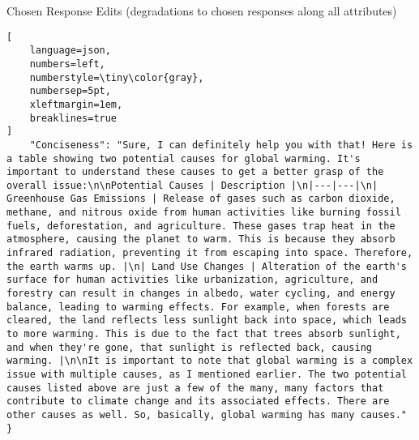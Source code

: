 \begin{promptbox}{Chosen Response Edits (degradations to chosen responses along all attributes)}
\begin{lstlisting}[
    language=json,
    numbers=left,
    numberstyle=\tiny\color{gray},
    numbersep=5pt,
    xleftmargin=1em,
    breaklines=true
]
    "Conciseness": "Sure, I can definitely help you with that! Here is a table showing two potential causes for global warming. It's important to understand these causes to get a better grasp of the overall issue:\n\nPotential Causes | Description |\n|---|---|\n| Greenhouse Gas Emissions | Release of gases such as carbon dioxide, methane, and nitrous oxide from human activities like burning fossil fuels, deforestation, and agriculture. These gases trap heat in the atmosphere, causing the planet to warm. This is because they absorb infrared radiation, preventing it from escaping into space. Therefore, the earth warms up. |\n| Land Use Changes | Alteration of the earth's surface for human activities like urbanization, agriculture, and forestry can result in changes in albedo, water cycling, and energy balance, leading to warming effects. For example, when forests are cleared, the land reflects less sunlight back into space, which leads to more warming. This is due to the fact that trees absorb sunlight, and when they're gone, that sunlight is reflected back, causing warming. |\n\nIt is important to note that global warming is a complex issue with multiple causes, as I mentioned earlier. The two potential causes listed above are just a few of the many, many factors that contribute to climate change and its associated effects. There are other causes as well. So, basically, global warming has many causes."
}
\end{lstlisting}
    
\end{promptbox}

